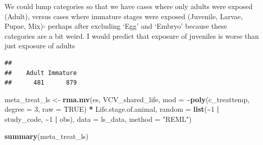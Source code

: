 \documentclass[
]{article}
\newenvironment{Shaded}{\begin{snugshade}}{\end{snugshade}}
\newcommand{\AttributeTok}[1]{\textcolor[rgb]{0.13,0.29,0.53}{#1}}
\newcommand{\ConstantTok}[1]{\textcolor[rgb]{0.56,0.35,0.01}{#1}}
\newcommand{\DecValTok}[1]{\textcolor[rgb]{0.00,0.00,0.81}{#1}}
\newcommand{\FunctionTok}[1]{\textcolor[rgb]{0.13,0.29,0.53}{\textbf{#1}}}
\newcommand{\NormalTok}[1]{#1}
\newcommand{\OtherTok}[1]{\textcolor[rgb]{0.56,0.35,0.01}{#1}}
\newcommand{\SpecialCharTok}[1]{\textcolor[rgb]{0.81,0.36,0.00}{\textbf{#1}}}
\newcommand{\StringTok}[1]{\textcolor[rgb]{0.31,0.60,0.02}{#1}}
\begin{document}
We could lump categories so that we have cases where only adults were
exposed (Adult), versus cases where immature stages were exposed
(Juvenile, Larvae, Pupae, Mix)- perhaps after excluding `Egg' and
`Embryo' because these categories are a bit weird. I would predict that
exposure of juveniles is worse than just exposure of adults

\begin{Shaded}
\end{Shaded}

\begin{verbatim}
## 
##    Adult Immature 
##      481      879
\end{verbatim}

\begin{Shaded}
\begin{Highlighting}[]
\NormalTok{meta\_treat\_ls }\OtherTok{\textless{}{-}} \FunctionTok{rma.mv}\NormalTok{(es, VCV\_shared\_life, }\AttributeTok{mod =} \SpecialCharTok{\textasciitilde{}}\FunctionTok{poly}\NormalTok{(c\_treattemp,}
    \AttributeTok{degree =} \DecValTok{3}\NormalTok{, }\AttributeTok{raw =} \ConstantTok{TRUE}\NormalTok{) }\SpecialCharTok{*}\NormalTok{ Life.stage.of.animal, }\AttributeTok{random =} \FunctionTok{list}\NormalTok{(}\SpecialCharTok{\textasciitilde{}}\DecValTok{1} \SpecialCharTok{|}
\NormalTok{    study\_code, }\SpecialCharTok{\textasciitilde{}}\DecValTok{1} \SpecialCharTok{|}\NormalTok{ obs), }\AttributeTok{data =}\NormalTok{ ls\_data, }\AttributeTok{method =} \StringTok{"REML"}\NormalTok{)}
\end{Highlighting}
\end{Shaded}

\begin{Shaded}
\begin{Highlighting}[]
\FunctionTok{summary}\NormalTok{(meta\_treat\_ls)}
\end{Highlighting}
\end{Shaded}
\end{document}
